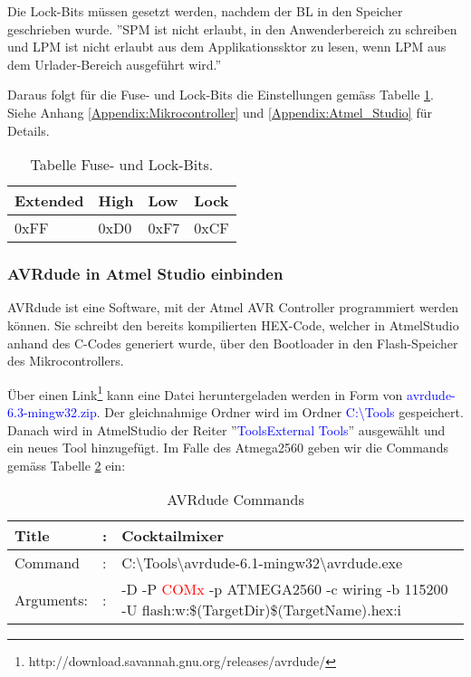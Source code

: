 Die Lock-Bits müssen gesetzt werden, nachdem der BL in den Speicher geschrieben wurde. ''SPM ist nicht erlaubt, in den Anwenderbereich zu schreiben und LPM ist nicht erlaubt aus dem Applikationssktor zu lesen, wenn LPM aus dem Urlader-Bereich ausgeführt wird.''

\newpage
Daraus folgt für die Fuse- und Lock-Bits die Einstellungen gemäss Tabelle \ref{tab:Fuse_und_Lock-Bits}. Siehe Anhang \ref{Appendix:Mikrocontroller} und \ref{Appendix:Atmel_Studio} für Details.

\begin{table}[h!]
\center
\begin{tabular}{|l|l|l|l|}
\hline
\textbf{Extended} & \textbf{High} & \textbf{Low} & \textbf{Lock}\\
\hline
0xFF & 0xD0 & 0xF7 & 0xCF\\
\hline
\end{tabular}
\caption{Tabelle Fuse- und Lock-Bits.}
\label{tab:Fuse_und_Lock-Bits}
\end{table}


\subsubsection{AVRdude in Atmel Studio einbinden}\label{subsubsec:avrdude_in_atmelstudio_einbinden}

AVRdude ist eine Software, mit der Atmel AVR Controller programmiert werden können. Sie schreibt den bereits kompilierten HEX-Code, welcher in AtmelStudio anhand des C-Codes generiert wurde, über den Bootloader in den Flash-Speicher des Mikrocontrollers.


Über einen Link\footnote{http://download.savannah.gnu.org/releases/avrdude/} kann eine Datei heruntergeladen werden in Form von \textcolor{blue}{avrdude-6.3-mingw32.zip}. Der gleichnahmige Ordner wird im Ordner \textcolor{blue}{C:\textbackslash Tools} gespeichert. Danach wird in AtmelStudio der Reiter ''\textcolor{blue}{Tools\textrightarrow External Tools}'' ausgewählt und ein neues Tool hinzugefügt. Im Falle des Atmega2560 geben wir die Commands gemäss Tabelle \ref{tab:AVRdude_commands} ein:

\begin{table}[h!]
\center
\begin{tabularx}{\textwidth}{|l|l|X|}
\hline
Title & : & Cocktailmixer \\
\hline
Command & : & C:\textbackslash Tools\textbackslash avrdude-6.1-mingw32\textbackslash avrdude.exe \\
\hline
Arguments: & : & -D -P \textcolor{red}{ COMx} -p ATMEGA2560 -c wiring -b 115200 -U flash:w:\$(TargetDir)\$(TargetName).hex:i\\
\hline
\end{tabularx}
\caption{AVRdude Commands}
\label{tab:AVRdude_commands}
\end{table}

